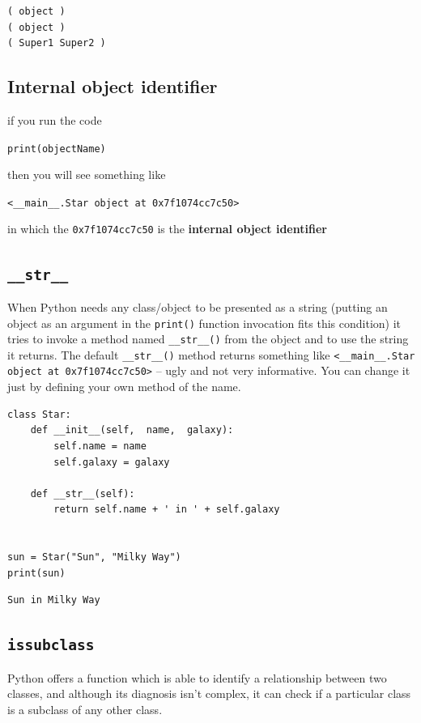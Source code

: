\documentclass[11pt]{article}
\begin{document}
\begin{verbatim}
( object )
( object )
( Super1 Super2 )
\end{verbatim}
\subsection{Internal object identifier}
\label{sec:org493d277}
if you run the code 

\texttt{print(objectName)}

then you will see something like

\texttt{<\_\_main\_\_.Star object at 0x7f1074cc7c50>}

in which the \texttt{0x7f1074cc7c50} is the \textbf{internal object identifier}

\subsection{\texttt{\_\_str\_\_}}
\label{sec:org5871af8}
When Python needs any class/object to be presented as a string
(putting an object as an argument in the \texttt{print()} function invocation
fits this condition) it tries to invoke a method named \texttt{\_\_str\_\_()}
from the object and to use the string it returns. The default
\texttt{\_\_str\_\_()} method returns something like \texttt{<\_\_main\_\_.Star object at
0x7f1074cc7c50>} – ugly and not very informative. You can change it
just by defining your own method of the name.

\begin{verbatim}
class Star:
	def __init__(self,  name,  galaxy):
		self.name = name
		self.galaxy = galaxy

	def __str__(self):
		return self.name + ' in ' + self.galaxy


sun = Star("Sun", "Milky Way")
print(sun)

\end{verbatim}

\begin{verbatim}
Sun in Milky Way
\end{verbatim}
\newpage

\subsection{\texttt{issubclass}}
\label{sec:org40c2371}
Python offers a function which is able to identify a relationship
between two classes, and although its diagnosis isn’t complex, it can
check if a particular class is a subclass of any other class.
\end{document}
